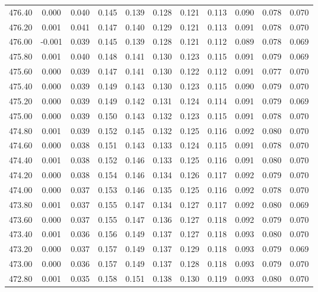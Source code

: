 \begin{longtable}{cccccccccc}
    476.40 &  0.000 &  0.040 &  0.145 &  0.139 &  0.128 &  0.121 &  0.113 &  0.090 &  0.078 &  0.070 \\
    476.20 &  0.001 &  0.041 &  0.147 &  0.140 &  0.129 &  0.121 &  0.113 &  0.091 &  0.078 &  0.070 \\
    476.00 & -0.001 &  0.039 &  0.145 &  0.139 &  0.128 &  0.121 &  0.112 &  0.089 &  0.078 &  0.069 \\
    475.80 &  0.001 &  0.040 &  0.148 &  0.141 &  0.130 &  0.123 &  0.115 &  0.091 &  0.079 &  0.069 \\
    475.60 &  0.000 &  0.039 &  0.147 &  0.141 &  0.130 &  0.122 &  0.112 &  0.091 &  0.077 &  0.070 \\
    475.40 &  0.000 &  0.039 &  0.149 &  0.143 &  0.130 &  0.123 &  0.115 &  0.090 &  0.079 &  0.070 \\
    475.20 &  0.000 &  0.039 &  0.149 &  0.142 &  0.131 &  0.124 &  0.114 &  0.091 &  0.079 &  0.069 \\
    475.00 &  0.000 &  0.039 &  0.150 &  0.143 &  0.132 &  0.123 &  0.115 &  0.091 &  0.078 &  0.070 \\
    474.80 &  0.001 &  0.039 &  0.152 &  0.145 &  0.132 &  0.125 &  0.116 &  0.092 &  0.080 &  0.070 \\
    474.60 &  0.000 &  0.038 &  0.151 &  0.143 &  0.133 &  0.124 &  0.115 &  0.091 &  0.078 &  0.070 \\
    474.40 &  0.001 &  0.038 &  0.152 &  0.146 &  0.133 &  0.125 &  0.116 &  0.091 &  0.080 &  0.070 \\
    474.20 &  0.000 &  0.038 &  0.154 &  0.146 &  0.134 &  0.126 &  0.117 &  0.092 &  0.079 &  0.070 \\
    474.00 &  0.000 &  0.037 &  0.153 &  0.146 &  0.135 &  0.125 &  0.116 &  0.092 &  0.078 &  0.070 \\
    473.80 &  0.001 &  0.037 &  0.155 &  0.147 &  0.134 &  0.127 &  0.117 &  0.092 &  0.080 &  0.069 \\
    473.60 &  0.000 &  0.037 &  0.155 &  0.147 &  0.136 &  0.127 &  0.118 &  0.092 &  0.079 &  0.070 \\
    473.40 &  0.001 &  0.036 &  0.156 &  0.149 &  0.137 &  0.127 &  0.118 &  0.093 &  0.080 &  0.070 \\
    473.20 &  0.000 &  0.037 &  0.157 &  0.149 &  0.137 &  0.129 &  0.118 &  0.093 &  0.079 &  0.069 \\
    473.00 &  0.000 &  0.036 &  0.157 &  0.149 &  0.137 &  0.128 &  0.118 &  0.093 &  0.079 &  0.070 \\
    472.80 &  0.001 &  0.035 &  0.158 &  0.151 &  0.138 &  0.130 &  0.119 &  0.093 &  0.080 &  0.070 \\

\end{longtable}
